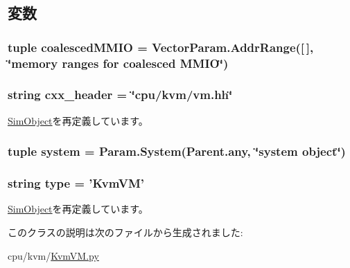 \subsection{変数}
\hypertarget{classKvmVM_1_1KvmVM_adb9506ca4d77eb0367380cdde678f978}{
\subsubsection[{coalescedMMIO}]{\setlength{\rightskip}{0pt plus 5cm}tuple coalescedMMIO = VectorParam.AddrRange(\mbox{[}$\,$\mbox{]}, \char`\"{}memory ranges for coalesced MMIO\char`\"{})}}
\label{classKvmVM_1_1KvmVM_adb9506ca4d77eb0367380cdde678f978}
\hypertarget{classKvmVM_1_1KvmVM_a17da7064bc5c518791f0c891eff05fda}{
\subsubsection[{cxx\_\-header}]{\setlength{\rightskip}{0pt plus 5cm}string cxx\_\-header = \char`\"{}cpu/{\bf kvm}/vm.hh\char`\"{}}}
\label{classKvmVM_1_1KvmVM_a17da7064bc5c518791f0c891eff05fda}


\hyperlink{classm5_1_1SimObject_1_1SimObject_a17da7064bc5c518791f0c891eff05fda}{SimObject}を再定義しています。\hypertarget{classKvmVM_1_1KvmVM_ab737471139f5a296e5b26e8a0e1b0744}{
\subsubsection[{system}]{\setlength{\rightskip}{0pt plus 5cm}tuple {\bf system} = Param.System(Parent.any, \char`\"{}system object\char`\"{})}}
\label{classKvmVM_1_1KvmVM_ab737471139f5a296e5b26e8a0e1b0744}
\hypertarget{classKvmVM_1_1KvmVM_acce15679d830831b0bbe8ebc2a60b2ca}{
\subsubsection[{type}]{\setlength{\rightskip}{0pt plus 5cm}string type = '{\bf KvmVM}'}}
\label{classKvmVM_1_1KvmVM_acce15679d830831b0bbe8ebc2a60b2ca}


\hyperlink{classm5_1_1SimObject_1_1SimObject_acce15679d830831b0bbe8ebc2a60b2ca}{SimObject}を再定義しています。

このクラスの説明は次のファイルから生成されました:\begin{DoxyCompactItemize}
\item 
cpu/kvm/\hyperlink{KvmVM_8py}{KvmVM.py}\end{DoxyCompactItemize}
